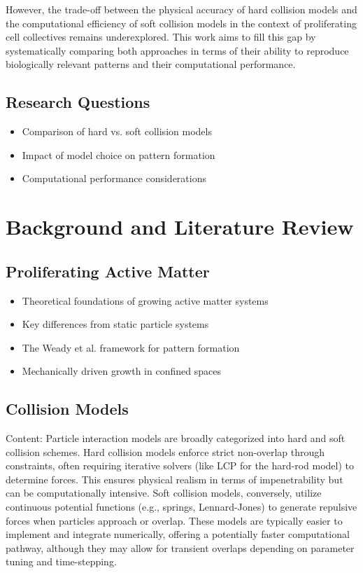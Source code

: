 \documentclass[conference]{IEEEtran}
\begin{document}
However, the trade-off between the physical accuracy of hard collision models and the computational efficiency of soft collision models in the context of proliferating cell collectives remains underexplored. This work aims to fill this gap by systematically comparing both approaches in terms of their ability to reproduce biologically relevant patterns and their computational performance.

\subsection{Research Questions}
\begin{itemize}
    \item Comparison of hard vs. soft collision models
    \item Impact of model choice on pattern formation
    \item Computational performance considerations
\end{itemize}

\newpage

\section{Background and Literature Review}


\subsection{Proliferating Active Matter}
\begin{itemize}
    \item Theoretical foundations of growing active matter systems
    \item Key differences from static particle systems
    \item The Weady et al. framework for pattern formation
    \item Mechanically driven growth in confined spaces
\end{itemize}

\newpage

\subsection{Collision Models}

Content: Particle interaction models are broadly categorized into hard and soft collision schemes. Hard collision models enforce strict non-overlap through constraints, often requiring iterative solvers (like LCP for the hard-rod model) to determine forces. This ensures physical realism in terms of impenetrability but can be computationally intensive. Soft collision models, conversely, utilize continuous potential functions (e.g., springs, Lennard-Jones) to generate repulsive forces when particles approach or overlap. These models are typically easier to implement and integrate numerically, offering a potentially faster computational pathway, although they may allow for transient overlaps depending on parameter tuning and time-stepping.
\end{document}
